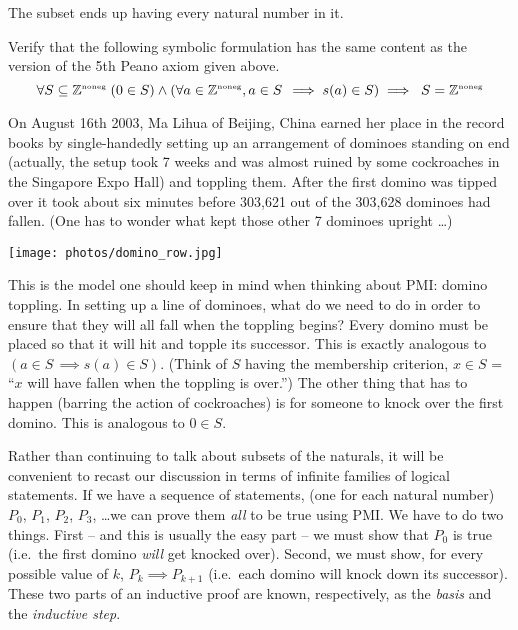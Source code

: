 The subset ends up having every natural number in it.

\begin{exer}
Verify that the following symbolic formulation has the same content
as the version of the 5th Peano axiom given above.
\[ \forall S \subseteq {\mathbb Z}^{\mbox{\tiny noneg}} \; ( 0 \in S ) \land (\forall a \in {\mathbb Z}^{\mbox{\tiny noneg}}, a \in S \, \implies s(a) \in S) \implies  \; S={\mathbb Z}^{\mbox{\tiny noneg}} \]

\end{exer}
\bigskip

On August 16th 2003, Ma Lihua of Beijing, China earned her place in the 
record books by single-handedly setting up an arrangement of dominoes 
standing on end (actually, the setup took 7 weeks and was almost ruined by
some cockroaches in the Singapore Expo Hall) and toppling them.  
After the first domino was tipped over it took about six minutes
before 303,621 out of the 303,628 dominoes had fallen. (One has to wonder 
what kept those other 7 dominoes upright \ldots)  

\begin{center}
\texttt{[image: photos/domino\_row.jpg]}
\end{center}

This is the model one should keep in mind when thinking about PMI: domino
toppling.  In setting up a line of dominoes, what do we need to do
in order to ensure that they will all fall when the toppling begins?
Every domino must be placed so that it will hit and topple its successor.
This is exactly analogous to $(a \in S \, \implies s(a) \in S)$.  (Think 
of $S$ having the membership criterion, $x \in S$ = ``$x$ will have fallen
when the toppling is over.'')   The other thing that has to happen
(barring the action of cockroaches) is for someone to knock over the
first domino.  This is analogous to $0 \in S$.

Rather than continuing to talk about subsets of the naturals, it will
be convenient to recast our discussion in terms of infinite families
of logical statements.  If we have a sequence of statements, (one
for each natural number) $P_0$, $P_1$, $P_2$, $P_3$, \ldots  we
can prove them \emph{all} to be true using PMI.  We have to do two
things.   First -- and this is usually the easy part -- we must show 
that $P_0$ is true (i.e.\ the first domino \emph{will} get knocked over).
Second, we must show, for every possible value of $k$, $P_k \implies P_{k+1}$
(i.e.\ each domino will knock down its successor).  These two parts 
of an inductive proof are known, respectively, as the \emph{basis}
and the \emph{inductive step}. 

